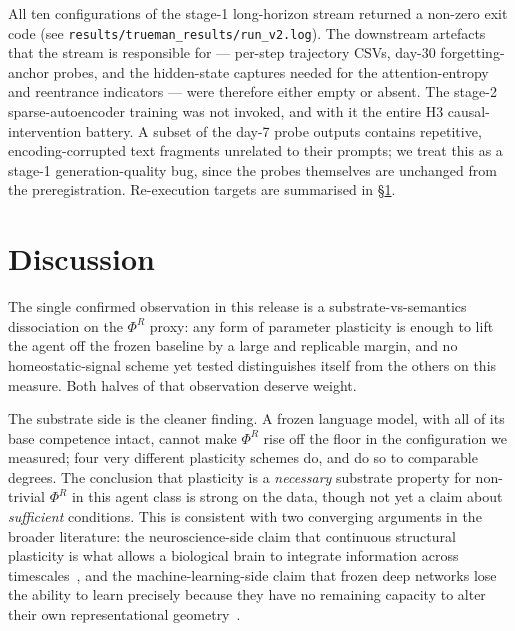 \documentclass[pdflatex,sn-mathphys-num]{sn-jnl}
\theoremstyle{thmstyleone}
\theoremstyle{thmstylethree}
\begin{document}
All ten configurations of the stage-1 long-horizon stream returned a non-zero exit code (see \texttt{results/trueman\_results/run\_v2.log}). The downstream artefacts that the stream is responsible for --- per-step trajectory CSVs, day-30 forgetting-anchor probes, and the hidden-state captures needed for the attention-entropy and reentrance indicators --- were therefore either empty or absent. The stage-2 sparse-autoencoder training was not invoked, and with it the entire H3 causal-intervention battery. A subset of the day-7 probe outputs contains repetitive, encoding-corrupted text fragments unrelated to their prompts; we treat this as a stage-1 generation-quality bug, since the probes themselves are unchanged from the preregistration. Re-execution targets are summarised in \S\ref{sec:discussion}.

\section{Discussion}\label{sec:discussion}

The single confirmed observation in this release is a substrate-vs-semantics dissociation on the $\Phi^R$ proxy: any form of parameter plasticity is enough to lift the agent off the frozen baseline by a large and replicable margin, and no homeostatic-signal scheme yet tested distinguishes itself from the others on this measure. Both halves of that observation deserve weight.

The substrate side is the cleaner finding. A frozen language model, with all of its base competence intact, cannot make $\Phi^R$ rise off the floor in the configuration we measured; four very different plasticity schemes do, and do so to comparable degrees. The conclusion that plasticity is a \emph{necessary} substrate property for non-trivial $\Phi^R$ in this agent class is strong on the data, though not yet a claim about \emph{sufficient} conditions. This is consistent with two converging arguments in the broader literature: the neuroscience-side claim that continuous structural plasticity is what allows a biological brain to integrate information across timescales~\cite{friston2022active, christov2025embodiment, hill2025sapin}, and the machine-learning-side claim that frozen deep networks lose the ability to learn precisely because they have no remaining capacity to alter their own representational geometry~\cite{dohare2023plasticity, joudaki2025barriers, he2025spectral}.
\end{document}

